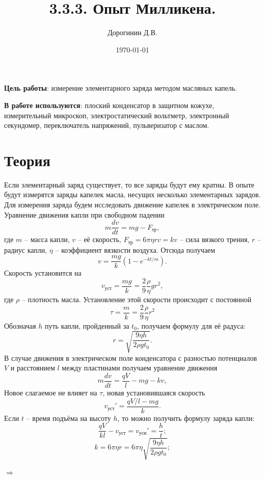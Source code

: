 \documentclass[a4paper,12pt]{article}
\author{Дорогинин Д.В.}
\title{3.3.3. Опыт Милликена.}
\date{\today}
\begin{document}
\maketitle
\newpage
\textbf{Цель работы}: измерение элементарного заряда методом масляных капель.


\textbf{В работе используются}: плоский конденсатор в защитном кожухе, измерительный микроскоп, электростатический вольтметр, электронный секундомер, переключатель напряжений, пульверизатор с маслом. 
\section*{Теория}
Если элементарный заряд существует, то все заряды будут ему кратны. В опыте будут измерятся заряды капелек масла, несущих несколько элементарных зарядов.\\
Для измерения заряда будем исследовать движение капелек в электрическом поле. Уравнение движения капли при свободном падении
\begin{equation}
m \dfrac{dv}{dt}=mg-F_{\text{тр}},
\end{equation}
где $m$ -- масса капли, $v$ -- её скорость, $F_{\text{тр}}=6\pi \eta rv = kv$ -- сила вязкого трения, $r$ -- радиус капли, $\eta$ -- коэффициент вязкости воздуха. Отсюда получаем 
\begin{equation}
v = \dfrac{mg}{k}\left(1 - e^{-kt/m}\right).
\end{equation}
Скорость установится на
$$
v_{\text{уст}}=\dfrac{mg}{k}=\dfrac{2}{9}\dfrac{\rho}{\eta}gr^2,
$$
где $\rho$ -- плотность масла. Установление этой скорости происходит с постоянной
$$
\tau = \dfrac{m}{k}=\dfrac{2}{9}\dfrac{\rho}{\eta}r^2
$$
Обозначая $h$ путь капли, пройденный за $t_0$, получаем формулу для её радуса:
\begin{equation}
r = \sqrt{\dfrac{9\eta h}{2\rho gt_0}}.
\end{equation}
В случае движения в электрическом поле конденсатора с разностью потенциалов $V$ и расстоянием $l$ между пластинами получаем уравнение движения
\begin{equation}
m \dfrac{dv}{dt}=\dfrac{qV}{l}-mg-kv,
\end{equation}
Новое слагаемое не влияет на $\tau$, новая установившаяся скорость
$$
v_{\text{уст}}'=\dfrac{qV/l - mg}{k}.
$$
Если $t$ -- время подъёма на высоту $h$, то можно получить формулу заряда капли:
$$
\dfrac{qV}{kl}-v_{\text{уст}}=v_{\text{уси}}'=\dfrac{h}{t};
$$
$$
k=6\pi \eta r  = 6\pi \eta  \sqrt{\dfrac{9\eta h}{2\rho gt_0}};
$$
\begin{center}
$\Rightarrow$ 
\end{center}
\end{document}
